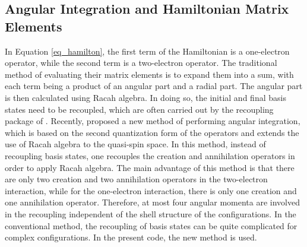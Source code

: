 \documentclass{elsart}
\begin{document}
\subsection{Angular Integration and Hamiltonian Matrix Elements}
In Equation \ref{eq_hamilton}, the first term of the Hamiltonian is a
one-electron operator, while the second term is a two-electron operator. The
traditional method of evaluating their matrix elements is to expand them into a
sum, with each term being a product of an angular part and a radial part. The
angular part is then calculated using Racah algebra. In doing so, the initial
and final basis states need to be recoupled, which are often carried out by
the recoupling package of \citet{grant76}. Recently, \citet{gaigalas97}
proposed a new method of performing angular integration, which is based on the
second quantization form of the operators and extends the use of Racah algebra
to the quasi-spin space. In this method, instead of recoupling basis states,
one recouples the creation and annihilation operators in order to apply Racah
algebra. The main advantage of this method 
is that there are only two creation and two annihilation operators in the
two-electron interaction, while for the one-electron interaction, there is
only one 
creation and one annihilation operator. Therefore, at most four angular momenta
are involved in the recoupling independent of the shell structure of the
configurations. In the conventional method, the recoupling of basis states can
be quite complicated for complex configurations. In the present code, the new
method is used.
\end{document}

